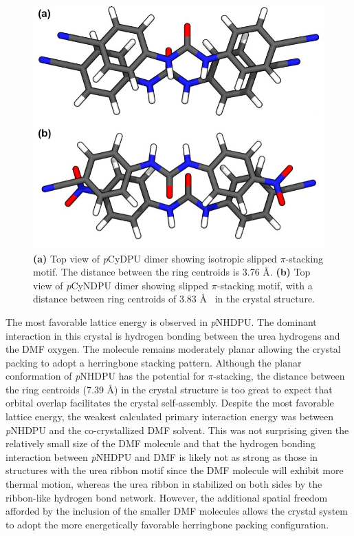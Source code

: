 \begin{figure}[h!]
    \centering
    \includegraphics[width=0.8\linewidth]{figures/pub3/Picture5.jpg}
    \caption{\textbf{\textbf{(a)}} Top view of \textit{p}CyDPU dimer showing isotropic slipped $\pi$-stacking motif. The distance between the ring centroids is 3.76 \AA. \textbf{(b)} 	Top view of \textit{p}CyNDPU dimer showing slipped $\pi$-stacking motif, with a distance between ring centroids of 3.83 \AA~ in the crystal structure.}\label{fig:slip-stack}
\end{figure}

The most favorable lattice energy is observed in \textit{p}NHDPU. The dominant interaction in this crystal is hydrogen bonding between the urea hydrogens and the DMF oxygen. The molecule remains moderately planar allowing the crystal packing to adopt a herringbone stacking pattern. Although the planar conformation of \textit{p}NHDPU has the potential for $\pi$-stacking, the distance between the ring centroids (7.39 \AA) in the crystal structure is too great to expect that orbital overlap facilitates the crystal self-assembly. Despite the most favorable lattice energy, the weakest calculated primary interaction energy was between \textit{p}NHDPU and the co-crystallized DMF solvent. This was not surprising given the relatively small size of the DMF molecule and that the hydrogen bonding interaction between \textit{p}NHDPU and DMF is likely not as strong as those in structures with the urea ribbon motif since the DMF molecule will exhibit more thermal motion, whereas the urea ribbon in stabilized on both sides by the ribbon-like hydrogen bond network. However, the additional spatial freedom afforded by the inclusion of the smaller DMF molecules allows the crystal system to adopt the more energetically favorable herringbone packing configuration. 

